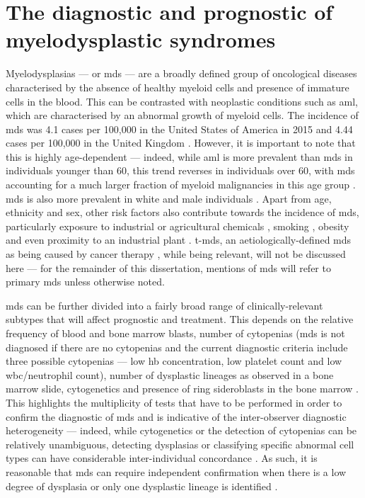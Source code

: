\section{The diagnostic and prognostic of myelodysplastic syndromes}

Myelodysplasias --- or \ac{mds} --- are a broadly defined group of oncological diseases characterised by the absence of healthy myeloid cells and presence of immature cells in the blood. This can be contrasted with neoplastic conditions such as \ac{aml}, which are characterised by an abnormal growth of myeloid cells. The incidence of \ac{mds} was 4.1 cases per 100,000 in the United States of America in 2015 \cite{Zeidan2019-jj} and 4.44 cases per 100,000 in the United Kingdom \cite{Roman2016-ad}. However, it is important to note that this is highly age-dependent --- indeed, while \ac{aml} is more prevalent than \ac{mds} in individuals younger than 60, this trend reverses in individuals over 60, with \ac{mds} accounting for a much larger fraction of myeloid malignancies in this age group \cite{Zeidan2019-jj}. \ac{mds} is also more prevalent in white and male individuals \cite{Zeidan2019-jj}. Apart from age, ethnicity and sex, other risk factors also contribute towards the incidence of \ac{mds}, particularly exposure to industrial or agricultural chemicals \cite{Nisse2001-qf,Lv2011-iv,Strom2005-pq}, smoking \cite{Lv2011-iv,Strom2005-pq}, obesity \cite{Ma2009-ws} and even proximity to an industrial plant \cite{Nisse2001-qf}. \Ac{t-mds}, an aetiologically-defined \ac{mds} as being caused by cancer therapy \cite{Kuendgen2021-in}, while being relevant, will not be discussed here --- for the remainder of this dissertation, mentions of \ac{mds} will refer to primary \ac{mds} unless otherwise noted.

\ac{mds} can be further divided into a fairly broad range of clinically-relevant subtypes that will affect prognostic and treatment. This depends on the relative frequency of blood and bone marrow blasts, number of cytopenias (\ac{mds} is not diagnosed if there are no cytopenias and the current diagnostic criteria include three possible cytopenias --- low \ac{hb} concentration, low platelet count and low \ac{wbc}/neutrophil count), number of dysplastic lineages as observed in a bone marrow slide, cytogenetics and presence of ring sideroblasts in the bone marrow \cite{Arber2016-os}. This highlights the multiplicity of tests that have to be performed in order to confirm the diagnostic of \ac{mds} and is indicative of the inter-observer diagnostic heterogeneity --- indeed, while cytogenetics or the detection of cytopenias can be relatively unambiguous, detecting dysplasias or classifying specific abnormal cell types can have considerable inter-individual concordance \cite{Font2013-lx, Parmentier2012-wm, Della_Porta2015-hw}. As such, it is reasonable that \ac{mds} can require independent confirmation when there is a low degree of dysplasia or only one dysplastic lineage is identified \cite{Arber2016-os}.

